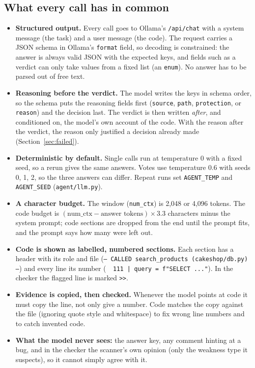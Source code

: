 \documentclass[11pt,a4paper]{article}
\newcommand{\code}[1]{\texttt{#1}}
\begin{document}
\subsection{What every call has in common}
\begin{itemize}
  \item \textbf{Structured output.} Every call goes to Ollama's \code{/api/chat} with a system message (the task) and a
        user message (the code). The request carries a JSON schema in Ollama's \code{format} field, so decoding is
        constrained: the answer is always valid JSON with the expected keys, and fields such as a verdict can only
        take values from a fixed list (an \code{enum}). No answer has to be parsed out of free text.
  \item \textbf{Reasoning before the verdict.} The model writes the keys in schema order, so the schema puts the
        reasoning fields first (\code{source}, \code{path}, \code{protection}, or \code{reason}) and the decision last.
        The verdict is then written \emph{after}, and conditioned on, the model's own account of the code. With the
        reason after the verdict, the reason only justified a decision already made (Section~\ref{sec:failed}).
  \item \textbf{Deterministic by default.} Single calls run at temperature 0 with a fixed seed, so a rerun gives the
        same answers. Votes use temperature 0.6 with seeds 0, 1, 2, so the three answers can differ. Repeat runs
        set \code{AGENT\_TEMP} and \code{AGENT\_SEED} (\code{agent/llm.py}).
  \item \textbf{A character budget.} The window (\code{num\_ctx}) is 2,048 or 4,096 tokens. The code budget is
        $(\text{num\_ctx} - \text{answer tokens}) \times 3.3$ characters minus the system prompt; code sections are
        dropped from the end until the prompt fits, and the prompt says how many were left out.
  \item \textbf{Code is shown as labelled, numbered sections.} Each section has a header with its role and file
        (\code{--- CALLED search\_products (cakeshop/db.py) ---}) and every line its number
        (\code{\ \ 111 | query = f"SELECT ..."}). In the checker the flagged line is marked \code{>>}.
  \item \textbf{Evidence is copied, then checked.} Whenever the model points at code it must copy the line, not only
        give a number. Code matches the copy against the file (ignoring quote style and whitespace) to fix wrong
        line numbers and to catch invented code.
  \item \textbf{What the model never sees:} the answer key, any comment hinting at a bug, and in the checker the
        scanner's own opinion (only the weakness type it suspects), so it cannot simply agree with it.
\end{itemize}
\end{document}
